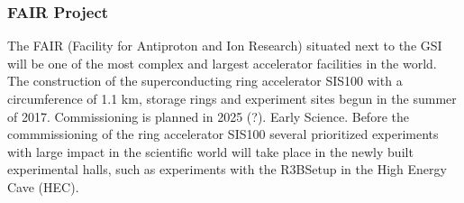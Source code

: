 \subsubsection{FAIR Project}
The FAIR (Facility for Antiproton and Ion Research) situated next to the GSI will be one of the most complex and largest accelerator facilities in the world. The construction of the superconducting ring accelerator SIS100 with a circumference of 1.1 km, storage rings and experiment sites begun in the summer of 2017. Commissioning is planned in 2025 (?). Early Science. Before the commmissioning of the ring accelerator SIS100 several prioritized experiments with large impact in the scientific world will take place in the newly built experimental halls, such as experiments with the R3BSetup in the High Energy Cave (HEC).\newline
 
